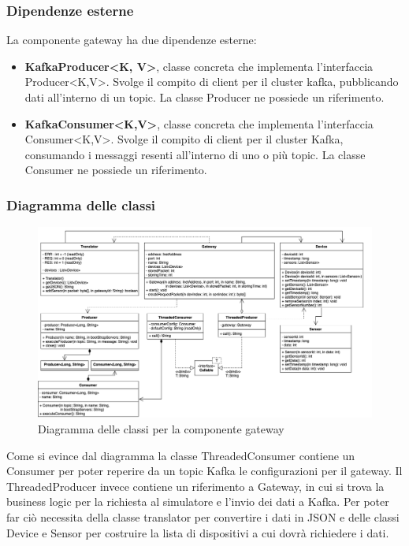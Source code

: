 	\subsubsection{Dipendenze esterne}	
		La componente gateway ha due dipendenze esterne: 
			\begin{itemize}
				\item \textbf{KafkaProducer<K, V>}, classe concreta che implementa l'interfaccia Producer<K,V>. Svolge il compito di client per il cluster kafka, pubblicando dati all'interno di un topic. La classe Producer ne possiede un riferimento.
				\item \textbf{KafkaConsumer<K,V>}, classe concreta che implementa l'interfaccia Consumer<K,V>. Svolge il compito di client per il cluster Kafka, consumando i messaggi resenti all'interno di uno o più topic. La classe Consumer ne possiede un riferimento.
			\end{itemize}	
		\newpage		

	\begin{landscape}
		\subsubsection{Diagramma delle classi}%
		  	\begin{figure}[H]
				\centering
				\includegraphics[scale=0.499]{res/images/GATEWAY/ClassiGateway.png}
				\caption{Diagramma delle classi per la componente gateway}
				\label{Diagramma 2}
			\end{figure}
	Come si evince dal diagramma la classe ThreadedConsumer contiene un Consumer per poter reperire da un topic Kafka le configurazioni per il gateway. Il ThreadedProducer invece contiene un riferimento a Gateway, in cui si trova la business logic per la richiesta al simulatore e l'invio dei dati a Kafka. Per poter far ciò necessita della classe translator per convertire i dati in JSON e delle classi Device e Sensor per costruire la lista di dispositivi a cui dovrà richiedere i dati.
	\end{landscape}
		
